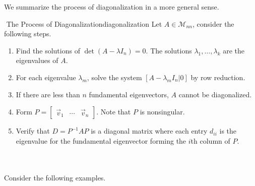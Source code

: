         We summarize the process of diagonalization in a more general sense.
        \begin{theorem}{\Stop\,\,The Process of Diagonalization}{diagonalization}
            Let \(A\in\mathcal{M}_{nn}\), consider the following steps.
            \begin{enumerate}
                \item Find the solutions of \(\det(A-\lambda I_n)=0\). The solutions \(\lambda_1,\ldots,\lambda_k\) are the eigenvalues of \(A\).
                \item For each eigenvalue \(\lambda_m\), solve the system \([A-\lambda_mI_n|0]\) by row reduction.
                \item If there are less than \(n\) fundamental eigenvectors, \(A\) cannot be diagonalized.
                \item Form \(P=\begin{bmatrix} \vec{v}_1 & \cdots & \vec{v}_n \end{bmatrix}\). Note that \(P\) is nonsingular.
                \item Verify that \(D=P^{-1}AP\) is a diagonal matrix where each entry \(d_{ii}\) is the eigenvalue for the fundamental eigenvector forming the \(i\)th column of \(P\).
            \end{enumerate}
        \end{theorem}
        \pagebreak
        \vphantom
        \\
        \\
        Consider the following examples.
